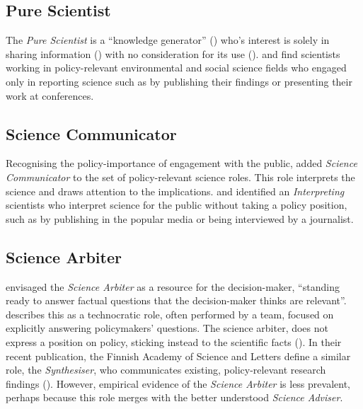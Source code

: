 \subsection{Pure Scientist}
The \emph{Pure Scientist} is a ``knowledge generator'' (\cite{BalvaneraJNOBCDGGKKMPSSW2020}) who's interest is solely in sharing information (\cite{Pielke2007}) with no consideration for its use (\cite{RapleyD2014}). \textcite{SteelLLS2004} and \textcite{SinghTKMMC2014} find scientists working in policy-relevant environmental and social science fields who engaged only in reporting science such as by publishing their findings or presenting their work at conferences.

\subsection{Science Communicator}
Recognising the policy-importance of engagement with the public, \textcite{RapleyD2014} added \emph{Science Communicator} to the set of policy-relevant science roles. This role interprets the science and draws attention to the implications. \textcite{SteelLLS2004} and \textcite{SinghTKMMC2014} identified an \emph{Interpreting} scientists who interpret science for the public without taking a policy position, such as by publishing in the popular media or being interviewed by a journalist.

\subsection{Science Arbiter}
\textcite{Pielke2007} envisaged the \emph{Science Arbiter} as a resource for the decision-maker, ``standing ready to answer factual questions that the decision-maker thinks are relevant''. \textcite{GluckmanBK2021} describes this as a technocratic role, often performed by a team, focused on explicitly answering policymakers' questions. The science arbiter, does not express a position on policy, sticking instead to the scientific facts (\cite{RapleyD2014}). In their recent publication, the Finnish Academy of Science and Letters define a similar role, the \emph{Synthesiser}, who communicates existing, policy-relevant research findings (\cite{KarkkainenLKK2024}). However, empirical evidence of the \emph{Science Arbiter} is less prevalent, perhaps because this role merges with the better understood \emph{Science Adviser}.

